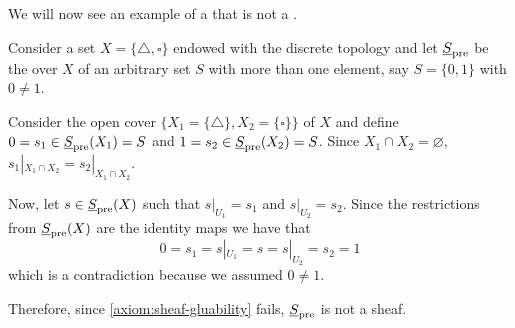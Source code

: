 \documentclass[../main.tex]{subfiles}
\begin{document}
We will now see an example of a  that is not a .
\begin{example} \label{ex:constant-presheaf-is-not-sheaf}
  Consider a set \(X = \{\triangle, \square\}\) endowed with the discrete topology and let \(\underline{S}_{\operatorname*{pre}}\) be the  over \(X\) of an arbitrary set \(S\) with more than one element, say \(S = \{0, 1\}\) with \(0 \neq 1\).

  Consider the open cover \(\{X_{1} = \{\triangle\}, X_{2} = \{\square\}\}\) of \(X\) and define \(0 = s_{1} \in \underline{S}_{\operatorname*{pre}}(X_{1}) = S\) and \(1 = s_{2} \in \underline{S}_{\operatorname*{pre}}(X_{2}) = S\).
  Since \(X_{1} \cap X_{2} = \varnothing\), \(s_{1}|_{X_{1} \cap X_{2}} = s_{2}|_{X_{1} \cap X_{2}}\).

  Now, let \(s \in \underline{S}_{\operatorname*{pre}}(X)\) such that \(s|_{U_{1}} = s_{1}\) and \(s|_{U_{2}} = s_{2}\).
  Since the restrictions from \(\underline{S}_{\operatorname*{pre}}(X)\) are the identity maps we have that
  \begin{equation*}
    0 = s_{1} = s|_{U_{1}} = s = s|_{U_{2}} = s_{2} = 1
  \end{equation*}
  which is a contradiction because we assumed \(0 \neq 1\).

  Therefore, since \ref{axiom:sheaf-gluability} fails, \(\underline{S}_{\operatorname*{pre}}\) is not a sheaf.
\end{example}
\end{document}
